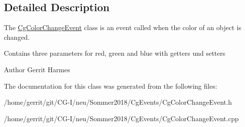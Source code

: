 \subsection{Detailed Description}
The \hyperlink{class_cg_color_change_event}{Cg\+Color\+Change\+Event} class is an event called when the color of an object is changed. 

Contains three parameters for red, green and blue with getters und setters

\begin{DoxyAuthor}{Author}
Gerrit Harmes 
\end{DoxyAuthor}


The documentation for this class was generated from the following files\+:\begin{DoxyCompactItemize}
\item 
/home/gerrit/git/\+C\+G-\/\+I/neu/\+Sommer2018/\+Cg\+Events/Cg\+Color\+Change\+Event.\+h\item 
/home/gerrit/git/\+C\+G-\/\+I/neu/\+Sommer2018/\+Cg\+Events/Cg\+Color\+Change\+Event.\+cpp\end{DoxyCompactItemize}
